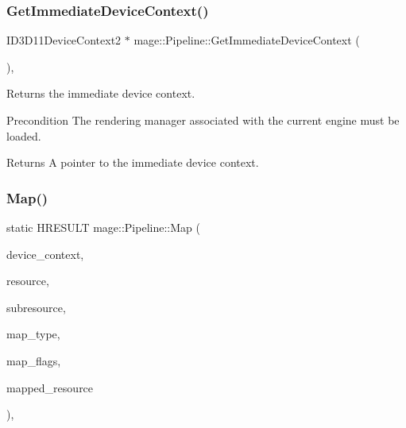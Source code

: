 \subsubsection{\texorpdfstring{Get\+Immediate\+Device\+Context()}{GetImmediateDeviceContext()}}
{\footnotesize\ttfamily I\+D3\+D11\+Device\+Context2 $\ast$ mage\+::\+Pipeline\+::\+Get\+Immediate\+Device\+Context (\begin{DoxyParamCaption}{ }\end{DoxyParamCaption})\hspace{0.3cm}{\ttfamily [static]}, {\ttfamily [noexcept]}}

Returns the immediate device context.

\begin{DoxyPrecond}{Precondition}
The rendering manager associated with the current engine must be loaded. 
\end{DoxyPrecond}
\begin{DoxyReturn}{Returns}
A pointer to the immediate device context. 
\end{DoxyReturn}
\hypertarget{structmage_1_1_pipeline_af41fb335c1ef0030522ba02c28158759}{}\label{structmage_1_1_pipeline_af41fb335c1ef0030522ba02c28158759} 
\subsubsection{\texorpdfstring{Map()}{Map()}}
{\footnotesize\ttfamily static H\+R\+E\+S\+U\+LT mage\+::\+Pipeline\+::\+Map (\begin{DoxyParamCaption}\item[{I\+D3\+D11\+Device\+Context2 $\ast$}]{device\+\_\+context,  }\item[{I\+D3\+D11\+Resource $\ast$}]{resource,  }\item[{\hyperlink{namespacemage_a41c104c036fba3756a74e19f793eeaa1}{U32}}]{subresource,  }\item[{D3\+D11\+\_\+\+M\+AP}]{map\+\_\+type,  }\item[{\hyperlink{namespacemage_a41c104c036fba3756a74e19f793eeaa1}{U32}}]{map\+\_\+flags,  }\item[{D3\+D11\+\_\+\+M\+A\+P\+P\+E\+D\+\_\+\+S\+U\+B\+R\+E\+S\+O\+U\+R\+CE $\ast$}]{mapped\+\_\+resource }\end{DoxyParamCaption})\hspace{0.3cm}{\ttfamily [static]}, {\ttfamily [noexcept]}}

\hypertarget{structmage_1_1_pipeline_a8d88f7c1e6e436c55fc7947334efaa9e}{}\label{structmage_1_1_pipeline_a8d88f7c1e6e436c55fc7947334efaa9e} 
